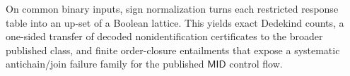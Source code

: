 On common binary inputs, sign normalization turns each restricted response table into an up-set of a Boolean lattice.  This yields exact Dedekind counts, a one-sided transfer of decoded nonidentification certificates to the broader published class, and finite order-closure entailments that expose a systematic antichain/join failure family for the published \(\mathsf{MID}\) control flow.